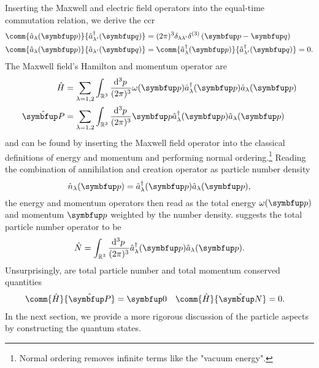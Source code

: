 Inserting the Maxwell and electric field operators into the equal-time commutation relation, we derive the \gls{ccr}
\begin{align}
	\comm{\hat{a}_\lambda(\vb{p})}{\hat{a}_{\lambda^\prime}^\dagger(\vb{q})}
	&=
	(2\pi)^3
	\delta_{\lambda\lambda^\prime}
	\delta^{(3)}\left(\vb{p}-\vb{q}\right)
	\label{eq:canonical_commutation_relation_nonzero}
	\\
	\comm{\hat{a}_\lambda(\vb{p})}{\hat{a}_{\lambda^\prime}(\vb{q})}
	&=
	\comm{\hat{a}_\lambda^\dagger(\vb{p})}{\hat{a}_{\lambda^\prime}^\dagger(\vb{q})}
	=
	0
	\label{eq:canonical_commutation_relation_zero}
	.
\end{align}
The Maxwell field's Hamilton and momentum operator are~\cite[p.~199]{Greiner2013}
\begin{align}
	\hat{H}
	&=
	\sum_{\lambda=1,2}
	\int_{\mathbb{R}^3}\frac{\dd[3]{p}}{(2\pi)^3}
	\omega(\vb{p})
	\hat{a}_\lambda^\dagger(\vb{p})
	\hat{a}_\lambda(\vb{p})
	\label{eq:maxwell_hamilton_operator}
	\\
	\vu{P}
	&=
	\sum_{\lambda=1,2}
	\int_{\mathbb{R}^3}\frac{\dd[3]{p}}{(2\pi)^3}
	\vb{p}
	\hat{a}_\lambda^\dagger(\vb{p})
	\hat{a}_\lambda(\vb{p})
	\label{eq:maxwell_momentum_operator}
\end{align}
and can be found by inserting the Maxwell field operator into the classical definitions of energy and momentum and performing normal ordering.\footnote{Normal ordering removes infinite terms like the "vacuum energy".}
Reading the combination of annihilation and creation operator as particle number density
\begin{equation}
	\hat{n}_\lambda(\vb{p})
	=
	\hat{a}_\lambda^\dagger(\vb{p})
	\hat{a}_\lambda(\vb{p})
	\label{eq:maxwell_number_density_operator}
	,
\end{equation}
the energy and momentum operators then read as the total energy $\omega(\vb{p})$ and momentum $\vb{p}$ weighted by the number density.
 suggests the total particle number operator to be
\begin{equation}
	\hat{N}
	=
	\int_{\mathbb{R}^3}\frac{\dd[3]{p}}{(2\pi)^3}
	\hat{a}_\lambda^\dagger(\vb{p})
	\hat{a}_\lambda(\vb{p})
	\label{eq:maxwell_number_operator}
	.
\end{equation}
Unsurprisingly, are total particle number and total momentum conserved quantities
\begin{align}
	\comm{\hat{H}}{\vu{P}}
	&=
	\vb{0}
	&
	\comm{\hat{H}}{\vu{N}}
	&=
	0
	.
\end{align}
In the next section, we provide a more rigorous discussion of the particle aspects by constructing the quantum states.